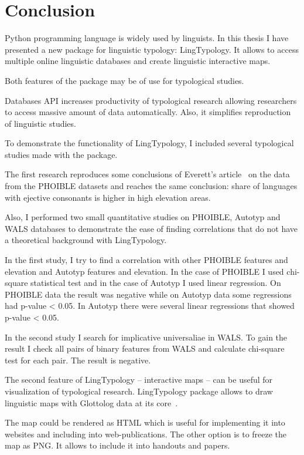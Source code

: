 \documentclass[a4paper,12pt]{article}
\begin{document}
\newpage

\section{Conclusion}

Python programming language is widely used by linguists. In this thesis I have presented a new package for linguistic typology: LingTypology. It allows to access multiple online linguistic databases and create linguistic interactive maps.

Both features of the package may be of use for typological studies.

Databases API increases productivity of typological research allowing researchers to access massive amount of data automatically. Also, it simplifies reproduction of linguistic studies.

To demonstrate the functionality of LingTypology, I included several typological studies made with the package.

The first research reproduces some conclusions of Everett's article~\parencite{ejectives} on the data from the PHOIBLE datasets and reaches the same conclusion: share of languages with ejective consonants is higher in high elevation areas.

Also, I performed two small quantitative studies on PHOIBLE, Autotyp and WALS databases to demonstrate the ease of finding correlations that do not have a theoretical background with LingTypology.

In the first study, I try to find a correlation with other PHOIBLE features and elevation and Autotyp features and elevation. In the case of PHOIBLE I used chi-square statistical test and in the case of Autotyp I used linear regression. On PHOIBLE data the result was negative while on Autotyp data some regressions had p-value < 0.05. In Autotyp there were several linear regressions that showed p-value < 0.05.

In the second study I search for implicative universaliae in WALS. To gain the result I check all pairs of binary features from WALS and calculate chi-square test for each pair. The result is negative.

The second feature of LingTypology -- interactive maps -- can be useful for visualization of typological research. LingTypology package allows to draw linguistic maps with Glottolog data at its core~\parencite{HaraldHammarstrom2019}.

The map could be rendered as HTML which is useful for implementing it into websites and including into web-publications. The other option is to freeze the map as PNG. It allows to include it into handouts and papers.
\end{document}
